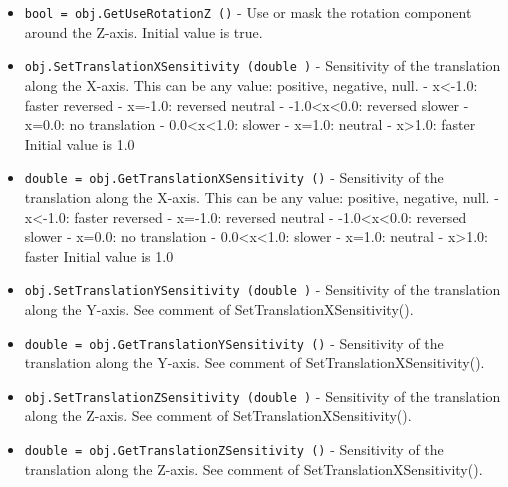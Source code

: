 \begin{itemize}
\item  \verb|bool = obj.GetUseRotationZ ()| -  Use or mask the rotation component around the Z-axis. Initial value is
 true.

\item  \verb|obj.SetTranslationXSensitivity (double )| -  Sensitivity of the translation along the X-axis. This can be any value:
 positive, negative, null.
 - x<-1.0: faster reversed
 - x=-1.0: reversed neutral
 - -1.0<x<0.0:  reversed slower
 - x=0.0: no translation
 - 0.0<x<1.0: slower
 - x=1.0: neutral
 - x>1.0: faster
 Initial value is 1.0

\item  \verb|double = obj.GetTranslationXSensitivity ()| -  Sensitivity of the translation along the X-axis. This can be any value:
 positive, negative, null.
 - x<-1.0: faster reversed
 - x=-1.0: reversed neutral
 - -1.0<x<0.0:  reversed slower
 - x=0.0: no translation
 - 0.0<x<1.0: slower
 - x=1.0: neutral
 - x>1.0: faster
 Initial value is 1.0

\item  \verb|obj.SetTranslationYSensitivity (double )| -  Sensitivity of the translation along the Y-axis.
 See comment of SetTranslationXSensitivity().

\item  \verb|double = obj.GetTranslationYSensitivity ()| -  Sensitivity of the translation along the Y-axis.
 See comment of SetTranslationXSensitivity().

\item  \verb|obj.SetTranslationZSensitivity (double )| -  Sensitivity of the translation along the Z-axis.
 See comment of SetTranslationXSensitivity().

\item  \verb|double = obj.GetTranslationZSensitivity ()| -  Sensitivity of the translation along the Z-axis.
 See comment of SetTranslationXSensitivity().

\end{itemize}
